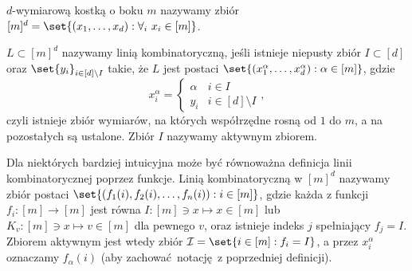 \begin{definition}
	$d$-wymiarową kostką o boku $m$ nazywamy zbiór $[m]^d = \set{(x_1,\ldots,x_d) : \forall_i \ x_i \in [m]}$.
\end{definition}

\begin{definition}
	$L\subset [m]^d$ nazywamy linią kombinatoryczną, jeśli istnieje niepusty zbiór $I\subset[d]$ oraz $\set{y_i}_{i\in[d]\setminus I}$ takie, że $L$ jest postaci $\set{(x_1^\alpha,\ldots,x_d^\alpha) : \alpha\in[m]}$, gdzie $$x_i^\alpha = \left\{ \begin{array}{lr}
			\alpha & i\in I             \\
			y_i    & i\in[d]\setminus I
		\end{array} \right.,$$
	czyli istnieje zbiór wymiarów, na których współrzędne rosną od $1$ do $m$, a na pozostałych są ustalone. Zbiór $I$ nazywamy aktywnym zbiorem.
\end{definition}

\begin{definition}
	Dla niektórych bardziej intuicyjna może być równoważna definicja linii kombinatorycznej poprzez funkcje.
	Linią kombinatoryczną w $[m]^d$ nazywamy zbiór postaci $\set{(f_1(i), f_2(i), \ldots, f_n(i)) : i \in [m]}$,
	gdzie każda z funkcji $f_i : [m] \to [m]$ jest równa $I : [m] \ni x \mapsto x \in [m]$ lub $K_v :
		[m] \ni x \mapsto v \in [m]$ dla pewnego $v$, oraz istnieje indeks $j$ spełniający $f_j = I$.
	Zbiorem aktywnym jest wtedy zbiór $\mathcal{I} = \set{i \in [m]: f_i = I}$,
	a przez $x_i^{\alpha}$ oznaczamy $f_{\alpha}(i)$ (aby zachować notację z poprzedniej definicji).
\end{definition}


